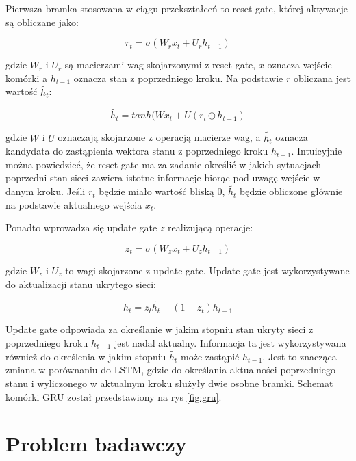 \documentclass[oneside, mag]{mgr}
\begin{document}
Pierwsza bramka stosowana w ciągu przekształceń to reset gate, której aktywacje są obliczane jako:

\begin{equation}
	r_t = \sigma (W_r x_t + U_r h_{t-1})
\end{equation}

gdzie $W_r$ i $U_r$ są macierzami wag skojarzonymi z reset gate, $x$ oznacza wejście komórki a $h_{t-1}$ oznacza stan z poprzedniego kroku. Na podstawie $r$ obliczana jest wartość $\tilde{h_t}$:

\begin{equation}
	\tilde{h_t} = tanh(Wx_t + U(r_t \odot h_{t-1})
\end{equation}

gdzie $W$ i $U$ oznaczają skojarzone z operacją macierze wag, a $\tilde{h_t}$ oznacza kandydata do zastąpienia wektora stanu z poprzedniego kroku $h_{t-1}$. Intuicyjnie można powiedzieć, że reset gate ma za zadanie określić w jakich sytuacjach poprzedni stan sieci zawiera istotne informacje biorąc pod uwagę wejście w danym kroku. Jeśli $r_t$ będzie miało wartość bliską 0, $\tilde{h_t}$ będzie obliczone głównie na podstawie aktualnego wejścia $x_t$.

Ponadto wprowadza się update gate $z$ realizującą operacje:

\begin{equation}
	z_t = \sigma(W_z x_t + U_z h_{t-1})
\end{equation}

gdzie $W_z$ i $U_z$ to wagi skojarzone z update gate. Update gate jest wykorzystywane do aktualizacji stanu ukrytego sieci:

\begin{equation}
	h_t = z_t \tilde{h_t} + (1 - z_t) h_{t-1}
\end{equation}


Update gate odpowiada za określanie w jakim stopniu stan ukryty sieci z poprzedniego kroku $h_{t-1}$ jest nadal aktualny. Informacja ta jest wykorzystywana również do określenia w jakim stopniu $\tilde{h_t}$ może zastąpić $h_{t-1}$. Jest to znacząca zmiana w porównaniu do LSTM, gdzie do określania aktualności poprzedniego stanu i wyliczonego w aktualnym kroku służyły dwie osobne bramki. Schemat komórki GRU został przedstawiony na rys \ref{fig:gru}.





\chapter{Problem badawczy}
\end{document}

